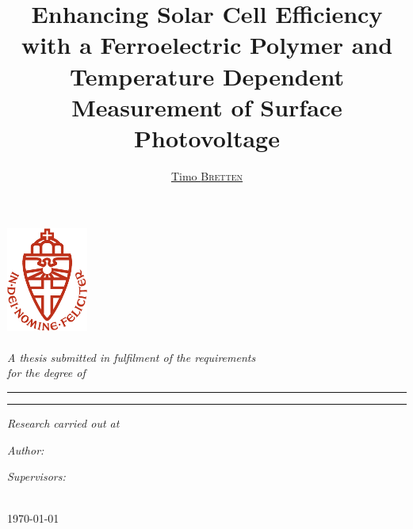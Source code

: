 \begin{titlepage}

\title{Enhancing Solar Cell Efficiency with a Ferroelectric Polymer and Temperature Dependent Measurement of Surface Photovoltage}
\author{\href{mailto:t.bretten@gmail.com}{Timo \textsc{Bretten}}}


\begin{center}
\includegraphics[width=0.2\textwidth]{../figs/logos/LogoRed}~\\[1cm]
\textsc{\LARGE \univname}\\[1.5cm]
\textit{\large A thesis submitted in fulfilment of the requirements\\ for the degree of \degreename}\\[0.5cm]

\hrule
\bigskip
{\huge \bfseries \ttitle \bigskip}
\hrule
\bigskip
\noindent
\textit{\large Research carried out at \\ \deptname{}}
\bigskip
\noindent

\begin{minipage}[t]{0.4\textwidth}
\begin{flushleft} \large
\emph{Author:}\\
\authorname
\end{flushleft}
\end{minipage}%
\begin{minipage}[t]{0.4\textwidth}
\begin{flushright} \large
\emph{Supervisors:} \\
\supname \\
\examname
\end{flushright}
\end{minipage}

\vfill

{\large \today}

\end{center}
\end{titlepage}
